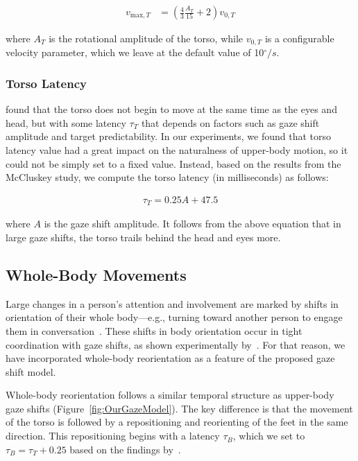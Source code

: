\begin{align} \label{eq:TorsoVmax}
v_{\mathrm{max},T} &= (\frac{4}{3} \frac{A_T}{15} + 2) v_{0,T}
\end{align}

where $A_T$ is the rotational amplitude of the torso, while $v_{0,T}$ is a configurable velocity parameter, which we leave at the default value of 10$^{\circ}/s$.

\subsubsection{Torso Latency}

\citet{mccluskey2007monkeys} found that the torso does not begin to move at the same time as the eyes and head, but with some latency $\tau_T$ that depends on factors such as gaze shift amplitude and target predictability. In our experiments, we found that torso latency value had a great impact on the naturalness of upper-body motion, so it could not be simply set to a fixed value. Instead, based on the results from the McCluskey study, we compute the torso latency (in milliseconds) as follows:

\begin{align} \label{eq:TorsoLatency}
\tau_{T} = 0.25 A + 47.5
\end{align}

where $A$ is the gaze shift amplitude. It follows from the above equation that in large gaze shifts, the torso trails behind the head and eyes more.

\subsection{Whole-Body Movements}
\label{sec:GazeShiftWholeBody}

Large changes in a person's attention and involvement are marked by shifts in orientation of their whole body---e.g., turning toward another person to engage them in conversation~\citep{kendon1990conducting}. These shifts in body orientation occur in tight coordination with gaze shifts, as shown experimentally by~\citet{hollands2004wholebody}. For that reason, we have incorporated whole-body reorientation as a feature of the proposed gaze shift model.

Whole-body reorientation follows a similar temporal structure as upper-body gaze shifts (Figure~\ref{fig:OurGazeModel}). The key difference is that the movement of the torso is followed by a repositioning and reorienting of the feet in the same direction. This repositioning begins with a latency $\tau_B$, which we set to $\tau_B = \tau_T + 0.25$ based on the findings by~\citet{hollands2004wholebody}.

